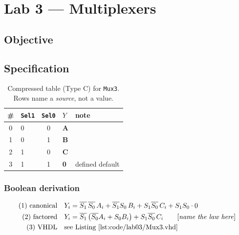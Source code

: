 
\chapter{Lab 3 --- Multiplexers}

\section{Objective}

\section{Specification}

\begin{table}[htbp]
\centering
\caption{Compressed table (Type C) for \texttt{Mux3}. Rows name a \emph{source},
not a value.}
\label{tab:lab03-truth}
\begin{tabular}{clc||ll}
\toprule
\# & \texttt{Sel1} & \texttt{Sel0} & $Y$ & note \\
\midrule
0 & 0 & 0 & \textbf{A} & \\
1 & 0 & 1 & \textbf{B} & \\
2 & 1 & 0 & \textbf{C} & \\
3 & 1 & 1 & \textbf{0} & defined default \\
\bottomrule
\end{tabular}
\end{table}


\subsection*{Boolean derivation}

\begin{align*}
\text{(1) canonical} \quad & Y_i = \overline{S_1}\,\overline{S_0}\,A_i + \overline{S_1}S_0\,B_i + S_1\overline{S_0}\,C_i + S_1 S_0 \cdot 0 \\
\text{(2) factored}  \quad & Y_i = \overline{S_1}\left( \overline{S_0}A_i + S_0 B_i \right) + S_1\overline{S_0}\,C_i
   \qquad \text{[\emph{name the law here}]} \\
\text{(3) VHDL} \quad & \text{see Listing~\ref{lst:code/lab03/Mux3.vhd}}
\end{align*}

